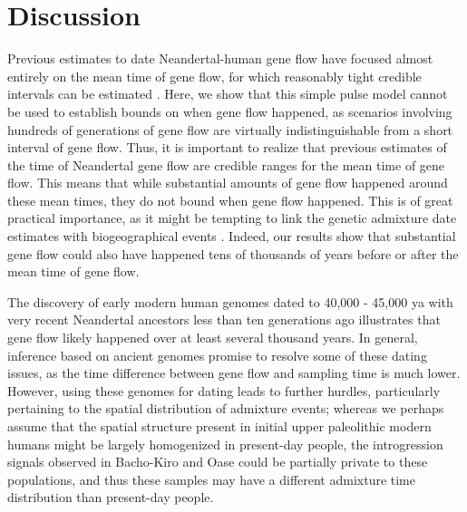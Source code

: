 \documentclass[]{article}
\begin{document}
\section{Discussion}\label{discussion}
Previous estimates to date Neandertal-human gene flow have focused almost entirely on the mean time of gene flow, for which reasonably tight credible intervals can be estimated \citep{sankararaman_date_2012, moorjani_genetic_2016}. Here, we show that this simple pulse model cannot be used to establish bounds on when gene flow happened, as scenarios involving hundreds of generations of gene flow are virtually indistinguishable from a short interval of gene flow. Thus, it is important to realize that previous estimates of the time of Neandertal gene flow are credible ranges for the mean time of gene flow. This means that while substantial amounts of gene flow happened around these mean times, they do not bound when gene flow happened. This is of great practical importance, as it might be tempting to link the genetic admixture date estimates with biogeographical events \citep{sankararaman_date_2012,lazaridis_genomic_2016,douka_age_2019,jacobs_multiple_2019,vyas_analyses_2019}. Indeed, our results show that substantial gene flow could also have happened tens of thousands of years before or after the mean time of gene flow. 

The discovery of early modern human genomes dated to 40,000 - 45,000 ya with very recent Neandertal ancestors less than ten generations ago \citep{fu_genome_2014, hajdinjak_early_2021} illustrates that gene flow likely happened over at least several thousand years.  In general, inference based on ancient genomes \citep{fu_genome_2014, fu_early_2015, moorjani_genetic_2016, hajdinjak_early_2021} promise to resolve some of these dating issues, as the time difference between gene flow and sampling time is much lower. However, using these genomes for dating leads to further hurdles, particularly pertaining to the spatial distribution of admixture events; whereas we perhaps assume that the spatial structure present in initial upper paleolithic modern humans might be largely homogenized in present-day people, the introgression signals observed in Bacho-Kiro and Oase could be partially private to these populations, and thus these samples may have a different admixture time distribution than present-day people.
\end{document}

